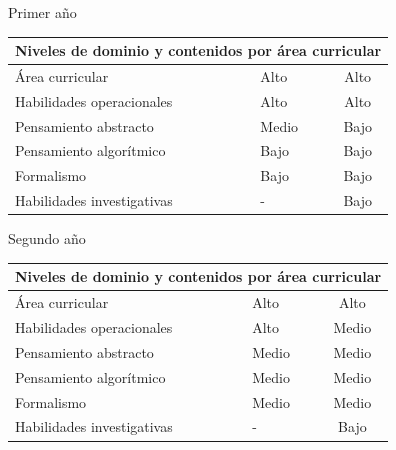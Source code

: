 \newpage
Primer año

\begin{table}[H]
\begin{center}
\begin{tabular}{|ccc|}
\hline
\multicolumn{3}{|c|}{\cellcolor[HTML]{00C0F3} \textbf{Niveles de dominio y contenidos por área curricular}} \\ \hline
\multicolumn{1}{|l|}{Área curricular} & \multicolumn{1}{l|}{Alto} & Alto \\ \hline
\multicolumn{1}{|l|}{Habilidades operacionales} & \multicolumn{1}{l|}{Alto} & Alto \\ \hline
\multicolumn{1}{|l|}{Pensamiento abstracto} & \multicolumn{1}{l|}{Medio} & Bajo \\ \hline
\multicolumn{1}{|l|}{Pensamiento algorítmico} & \multicolumn{1}{l|}{Bajo} & Bajo \\ \hline
\multicolumn{1}{|l|}{Formalismo} & \multicolumn{1}{l|}{Bajo} & Bajo \\ \hline
\multicolumn{1}{|l|}{Habilidades investigativas} & \multicolumn{1}{l|}{-} & Bajo \\ \hline
\end{tabular}
\end{center}
\end{table}

Segundo año

\begin{table}[H]
\begin{center}
\begin{tabular}{|ccc|}
\hline
\multicolumn{3}{|c|}{\cellcolor[HTML]{00C0F3} \textbf{Niveles de dominio y contenidos por área curricular}} \\ \hline
\multicolumn{1}{|l|}{Área curricular} & \multicolumn{1}{l|}{Alto} & Alto \\ \hline
\multicolumn{1}{|l|}{Habilidades operacionales} & \multicolumn{1}{l|}{Alto} & Medio \\ \hline
\multicolumn{1}{|l|}{Pensamiento abstracto} & \multicolumn{1}{l|}{Medio} & Medio \\ \hline
\multicolumn{1}{|l|}{Pensamiento algorítmico} & \multicolumn{1}{l|}{Medio} & Medio \\ \hline
\multicolumn{1}{|l|}{Formalismo} & \multicolumn{1}{l|}{Medio} & Medio \\ \hline
\multicolumn{1}{|l|}{Habilidades investigativas} & \multicolumn{1}{l|}{-} & Bajo \\ \hline
\end{tabular}
\end{center}
\end{table}

